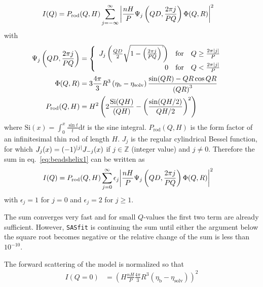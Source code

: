 \begin{align}
I(Q) &= P_\text{rod}(Q,H) \sum_{j=-\infty}^{\infty} \abs{\frac{nH}{P}\Psi_j\left(QD,\frac{2\pi j}{PQ}\right) \Phi(Q,R)}^2
\label{eq:beadshelix1}
\end{align}
with
\begin{align}
\Psi_j\left(QD,\frac{2\pi j}{PQ}\right) &=
\begin{cases}
\begin{array}{rcl}
J_j\left(\frac{QD}{2}\sqrt{1-\left(\frac{2\pi j}{PQ}\right)}\right) & \text{for} & Q\geq \frac{2\pi\abs{j}}{P}\\
0 & \text{for} & Q < \frac{2\pi\abs{j}}{P}
\end{array}
\end{cases}\\
\Phi(Q,R) &= 3\frac{4\pi}{3}R^3\left(\eta_\text{b}-\eta_\text{solv}\right)\frac{\sin(QR)-QR\cos{QR}}{\left(QR\right)^3} \\
P_\text{rod}(Q,H) &= H^2 \left(2\frac{\mathrm{Si}(QH)}{(QH)}-\left(\frac{\sin(QH/2)}{QH/2}\right)^2\right)
\end{align}
where $\mathrm{Si}(x)=\int_0^x\frac{\sin t}{t}\mathrm{d}t$ is the sine integral. $P_\text{rod}(Q,H)$ is the form factor of an infinitesimal thin rod of length $H$.
$J_j$ is the regular cylindrical Bessel function, for which $J_{j}(x)=(-1)^\abs{j}J_{-j}(x)$ if $j\in \mathbb{Z}$ (integer value) and $j \neq 0$.
Therefore the sum in eq.\ \ref{eq:beadshelix1} can be written as
\begin{align}
I(Q) &= P_\text{rod}(Q,H) \sum_{j=0}^{\infty} \epsilon_j \abs{\frac{nH}{P}\Psi_j\left(QD,\frac{2\pi j}{PQ}\right) \Phi(Q,R)}^2
\label{eq:beadshelix2}
\end{align}
with $\epsilon_j=1$ for $j=0$ and $\epsilon_j=2$ for $j\geq 1$.

The sum converges very fast and for small $Q$-values the first two term are already sufficient. However, {\tt SASfit} is continuing the sum until either the argument below the square root becomes negative or the relative change of the sum is less than $10^{-10}$.

The forward scattering of the model is normalized so that
\begin{align}
I(Q=0) &= \left(H\frac{nH}{P}\frac{4\pi}{3}R^3\left(\eta_\text{b}-\eta_\text{solv}\right)\right)^2
\end{align}

\vspace{5mm}

